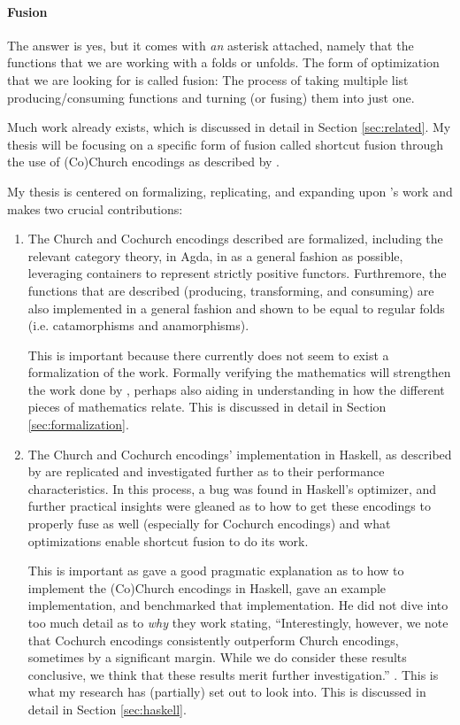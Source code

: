 \paragraph{Fusion}
The answer is yes{\Large*}, but it comes with \textit{an} asterisk attached, namely that the functions that we are working with a folds or unfolds.
The form of optimization that we are looking for is called fusion:
The process of taking multiple list producing/consuming functions and turning (or fusing) them into just one.

Much work already exists, which is discussed in detail in Section \ref{sec:related}.
My thesis will be focusing on a specific form of fusion called shortcut fusion through the use of (Co)Church encodings as described by \cite{Harper2011}.

My thesis is centered on formalizing, replicating, and expanding upon \cite{Harper2011}'s work and makes two crucial contributions:
\begin{enumerate}
    \item The Church and Cochurch encodings described are formalized, including the relevant category theory, in Agda, in as a general fashion as possible, leveraging containers \citep{Abbott2005} to represent strictly positive functors.
    Furthremore, the functions that are described (producing, transforming, and consuming) are also implemented in a general fashion and shown to be equal to regular folds (i.e. catamorphisms and anamorphisms).

    This is important because there currently does not seem to exist a formalization of the work.
    Formally verifying the mathematics will strengthen the work done by \cite{Harper2011}, perhaps also aiding in understanding in how the different pieces of mathematics relate.
    This is discussed in detail in Section \ref{sec:formalization}.
    \item The Church and Cochurch encodings' implementation in Haskell, as described by \cite{Harper2011} are replicated and investigated further as to their performance characteristics.
    In this process, a bug was found in Haskell's optimizer, and further practical insights were gleaned as to how to get these encodings to properly fuse as well (especially for Cochurch encodings) and what optimizations enable shortcut fusion to do its work.

    This is important as \cite{Harper2011} gave a good pragmatic explanation as to how to implement the (Co)Church encodings in Haskell, gave an example implementation, and benchmarked that implementation.
    He did not dive into too much detail as to \textit{why} they work stating, ``Interestingly, however, we note that Cochurch encodings consistently outperform Church encodings, sometimes by a significant margin. While we do consider these results conclusive, we think that these results merit further investigation.'' \citep{Harper2011}.
    This is what my research has (partially) set out to look into.
    This is discussed in detail in Section \ref{sec:haskell}.
\end{enumerate}
\citep{Muylder2023}




